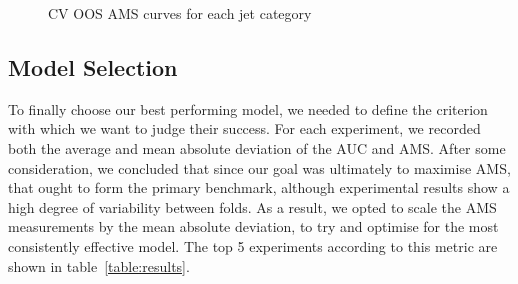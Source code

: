 \begin{figure}[htbp]
    \begin{adjustbox}{max width=1.4\linewidth,center}
    \centering
     \hspace*{-0.9em}
     \hspace*{-0.9em}
    \end{adjustbox}
    \caption{CV OOS AMS curves for each jet category}
    \label{fig:ams_curve}
\end{figure}


\subsection{Model Selection}
To finally choose our best performing model, we needed to define the criterion with which we want to judge their success. For each experiment, we recorded both the average and mean absolute deviation of the AUC and AMS. After some consideration, we concluded that since our goal was ultimately to maximise AMS, that ought to form the primary benchmark, although experimental results show a high degree of variability between folds. As a result, we opted to scale the AMS measurements by the mean absolute deviation, to try and optimise for the most consistently effective model. The top 5 experiments according to this metric are shown in table~\ref{table:results}. 

